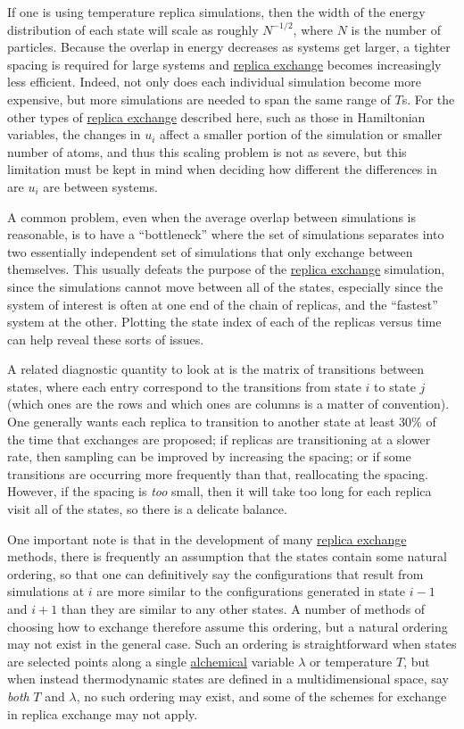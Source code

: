 \documentclass[9pt,review]{livecoms}
\begin{document}
If one is using temperature replica simulations, then the width of the energy distribution of each state will scale as roughly $N^{-1/2}$, where $N$ is the number of particles. Because the overlap in energy decreases as systems get larger, a tighter spacing is required for large systems and \hyperlink{ref:ReplEx} {replica exchange} becomes increasingly less efficient. Indeed, not only does each individual simulation become more expensive, but more simulations are needed to span the same range of $T$s. For the other types of \hyperlink{ref:ReplEx} {replica exchange} described here, such as those in Hamiltonian variables, the changes in $u_i$ affect a smaller portion of the simulation or smaller number of atoms, and thus this scaling problem is not as severe, but this limitation must be kept in mind when deciding how different the differences in are $u_i$ are between systems.

A common problem, even when the average overlap between simulations is reasonable, is to have a ``bottleneck'' where the set of simulations separates into two essentially independent set of simulations that only exchange between themselves. This usually defeats the purpose of the \hyperlink{ref:ReplEx} {replica exchange} simulation, since the simulations cannot move between all of the states, especially since the system of interest is often at one end of the chain of replicas, and the ``fastest'' system at the other. Plotting the state index of each of the replicas versus time can help reveal these sorts of issues.


A related diagnostic quantity to look at is the matrix of transitions between states, where each entry correspond to the transitions from state $i$ to state $j$ (which ones are the rows and which ones are columns is a matter of convention).  One generally wants each replica to transition to another state at least 30\% of the time that exchanges are proposed; if replicas are transitioning at a slower rate, then sampling can be improved by increasing the spacing; or if some transitions are occurring more frequently than that, reallocating the spacing. However, if the spacing is \textit{too} small, then it will take too long for each replica visit all of the states, so there is a delicate balance.


One important note is that in the development of many \hyperlink{ref:ReplEx} {replica exchange} methods, there is frequently an assumption that the states contain some natural ordering, so that one can definitively say the configurations that result from simulations at $i$ are more similar to the configurations generated in state $i-1$ and $i+1$ than they are similar to any other states.  A number of methods of choosing how to exchange therefore assume this ordering, but a natural ordering may not exist in the general case.  Such an ordering is straightforward when states are selected points along a single \hyperlink{ref:Alchemical} {alchemical} variable $\lambda$ or temperature $T$, but when instead thermodynamic states are defined in a multidimensional space, say \emph{both} $T$ and $\lambda$, no such ordering may exist, and some of the schemes for exchange in replica exchange may not apply.
\end{document}
